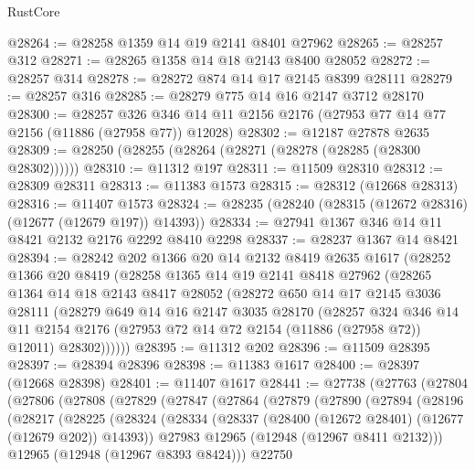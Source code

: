 \begin{lexlean}{RustCore}
\begin{coremodule}
@28264 := @28258 @1359 @14 @19 @2141 @8401 @27962
@28265 := @28257 @312
@28271 := @28265 @1358 @14 @18 @2143 @8400 @28052
@28272 := @28257 @314
@28278 := @28272 @874 @14 @17 @2145 @8399 @28111
@28279 := @28257 @316
@28285 := @28279 @775 @14 @16 @2147 @3712 @28170
@28300 := @28257
    @326
    @346
    @14
    @11
    @2156
    @2176
    (@27953 @77 @14 @77 @2156 (@11886 (@27958 @77)) @12028)
@28302 := @12187 @27878 @2635
@28309 := @28250 (@28255 (@28264 (@28271 (@28278 (@28285 (@28300 @28302))))))
@28310 := @11312 @197
@28311 := @11509 @28310
@28312 := @28309 @28311
@28313 := @11383 @1573
@28315 := @28312 (@12668 @28313)
@28316 := @11407 @1573
@28324 := @28235 (@28240 (@28315 (@12672 @28316) (@12677 (@12679 @197)) @14393))
@28334 := @27941 @1367 @346 @14 @11 @8421 @2132 @2176 @2292 @8410 @2298
@28337 := @28237 @1367 @14 @8421
@28394 := @28242
    @202
    @1366
    @20
    @14
    @2132
    @8419
    @2635
    @1617
    (@28252
      @1366
      @20
      @8419
      (@28258
        @1365
        @14
        @19
        @2141
        @8418
        @27962
        (@28265
          @1364
          @14
          @18
          @2143
          @8417
          @28052
          (@28272
            @650
            @14
            @17
            @2145
            @3036
            @28111
            (@28279
              @649
              @14
              @16
              @2147
              @3035
              @28170
              (@28257
                @324
                @346
                @14
                @11
                @2154
                @2176
                (@27953 @72 @14 @72 @2154 (@11886 (@27958 @72)) @12011)
                @28302))))))
@28395 := @11312 @202
@28396 := @11509 @28395
@28397 := @28394 @28396
@28398 := @11383 @1617
@28400 := @28397 (@12668 @28398)
@28401 := @11407 @1617
@28441 := @27738
    (@27763
      (@27804
        (@27806
          (@27808
            (@27829
              (@27847
                (@27864
                  (@27879
                    (@27890
                      (@27894
                        (@28196
                          (@28217
                            (@28225
                              (@28324
                                (@28334
                                  (@28337 (@28400 (@12672 @28401) (@12677 (@12679 @202)) @14393))
                                  @27983
                                  @12965
                                  (@12948 (@12967 @8411 @2132)))
                                @12965
                                (@12948 (@12967 @8393 @8424)))
                              @22750

\end{coremodule}
\end{lexlean}
